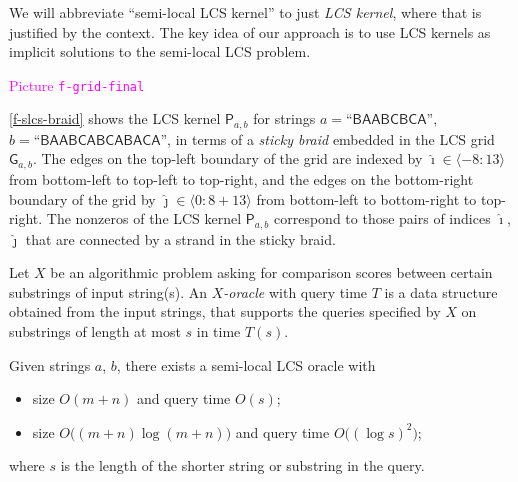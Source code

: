 \documentclass[a4paper,UKenglish,cleveref]{lipics-v2021}
\newcommand{\R}{\mathsf}
\newcommand{\A}{\hat}
\newcommand{\bigpa}[1]{\bigl(#1\bigr)}
\newcommand{\ang}[1]{\langle#1\rangle}
\begin{document}
We will abbreviate ``semi-local LCS kernel'' to just \emph{LCS kernel}, 
where that is justified by the context.
The key idea of our approach is to use LCS kernels
as implicit solutions to the semi-local LCS problem.

%
%

\textcolor{magenta}{Picture {\tt f-grid-final}}

\begin{example}
%
\cref{f-slcs-braid} shows the LCS kernel $\R P_{a,b}$ for strings 
$a = \textsf{``BAABCBCA''}$, $b = \textsf{``BAABCABCABACA''}$,
in terms of a \emph{sticky braid} embedded in the LCS grid $\R G_{a,b}$.
The edges on the top-left boundary of the grid are indexed by $\A\imath \in \ang{-8:13}$
from bottom-left to top-left to top-right, 
and the edges on the bottom-right boundary of the grid by $\A\jmath \in \ang{0:8+13}$
from bottom-left to bottom-right to top-right.
The nonzeros of the LCS kernel $\R P_{a,b}$ correspond 
to those pairs of indices $\A\imath$, $\A\jmath$
that are connected by a strand in the sticky braid.
%
\end{example}
%
\begin{definition}
%
%
Let $X$ be an algorithmic problem 
asking for comparison scores between certain substrings of input string(s).
An \emph{$X$-oracle} with query time $T$ is a data structure obtained from the input strings,
that supports the queries specified by $X$ on substrings of length at most $s$ in time $T(s)$.
%
\end{definition}
%
\begin{theorem}
\label{th-slcs-oracle}
%
Given strings $a$, $b$, there exists a semi-local LCS oracle with 
%
\begin{itemize}
%
\item size $O(m+n)$ and query time $O(s)$;
\item size $O\bigpa{(m+n)\log(m+n)}$ and query time $O\bigpa{(\log s)^2}$;
%
\end{itemize}
%
where $s$ is the length of the shorter string or substring in the query.
%
\end{theorem}
\end{document}
